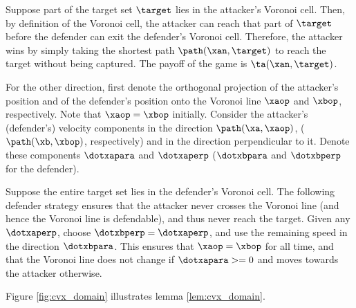 \begin{IEEEproof}
Suppose part of the target set $\target$ lies in the attacker's Voronoi cell. Then, by definition of the Voronoi cell, the attacker can reach that part of $\target$ before the defender can exit the defender's Voronoi cell. Therefore, the attacker wins by simply taking the shortest path $\path(\xan,\target)$ to reach the target without being captured. The payoff of the game is $\ta(\xan,\target)$.

For the other direction, first denote the orthogonal projection of the attacker's position and of the defender's position onto the Voronoi line $\xaop$ and $\xbop$, respectively. Note that $\xaop=\xbop$ initially. Consider the attacker's (defender's) velocity components in the direction $\path(\xa,\xaop)$, ($\path(\xb,\xbop)$, respectively) and in the direction perpendicular to it. Denote these components $\dotxapara$ and $\dotxaperp$ ($\dotxbpara$ and $\dotxbperp$ for the defender).

Suppose the entire target set lies in the defender's Voronoi cell. The following defender strategy ensures that the attacker never crosses the Voronoi line (and hence the Voronoi line is defendable), and thus never reach the target. Given any $\dotxaperp$, choose $\dotxbperp=\dotxaperp$, and use the remaining speed in the direction $\dotxbpara$. This ensures that $\xaop=\xbop$ for all time, and that the Voronoi line does not change if $\dotxapara>=0$ and moves towards the attacker otherwise.
\end{IEEEproof}

Figure \ref{fig:cvx_domain} illustrates lemma \ref{lem:cvx_domain}.

